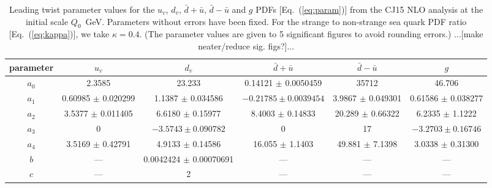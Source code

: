 \documentclass[aps,prd,amsmath,preprint]{revtex4}
\begin{document}
\begin{table}[t]
\begin{center}
\caption{Leading twist parameter values for the
	$u_v$, $d_v$, $\bar d+\bar u$, $\bar d-\bar u$ and $g$ PDFs
	[Eq.~(\ref{eq:param})] from the CJ15 NLO analysis at the
	initial scale $Q_0$~GeV.  Parameters without errors have
	been fixed.  For the strange to non-strange sea quark PDF
	ratio [Eq.~(\ref{eq:kappa})], we take $\kappa=0.4$.
	(The parameter values are given to 5 significant figures
	to avoid rounding errors.)
	{\color{red} ...[make neater/reduce sig. figs?]...} \\}
{\scriptsize
\begin{tabular}{c|ccccc}\hline
parameter	& $u_v$
		& $d_v$
		& $\bar d+\bar u$
		& $\bar d-\bar u$
		& $g$				\\ \hline
$a_0$		& 2.3585
		& 23.233
		& 0.14121 $\pm$ 0.0050459
		& 35712
		& 46.706			\\
$a_1$		& 0.60985 $\pm$ 0.020299
		& 1.1387 $\pm$ 0.034586
		& $-0.21785 \pm 0.0039454$
		& 3.9867 $\pm$ 0.049301
		& 0.61586 $\pm$ 0.038277	\\
$a_2$		& 3.5377 $\pm$ 0.011405
		& 6.6180 $\pm$ 0.15977
		& 8.4003 $\pm$ 0.14833
		& 20.289 $\pm$ 0.66322
		& 6.2335 $\pm$ 1.1222		\\
$a_3$		& 0
		& $-3.5743 \pm 0.090782$
		& 0
		& 17
		& $-3.2703 \pm 0.16746$		\\		
$a_4$		& 3.5169 $\pm$ 0.42791
		& 4.9133 $\pm$ 0.14586
		& 16.055 $\pm$ 1.1403
		& 49.881 $\pm$ 7.1398
		& 3.0338 $\pm$ 0.31300		\\
$b$		& ---
		& 0.0042424 $\pm$ 0.00070691
		& ---
		& ---
		& ---				\\
$c$		& ---
		& 2
		& ---
		& ---
		& ---				\\ \hline
\end{tabular}
}
\label{tab:LTparams}
\end{center}
\end{table}
\end{document}
